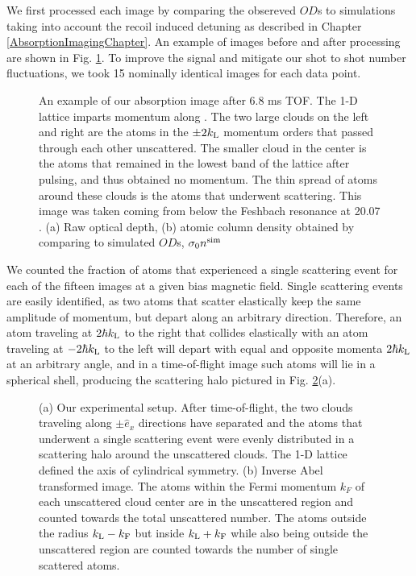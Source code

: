 We first processed each image by comparing the obsereved $OD$s to simulations taking into account the recoil induced detuning as described in Chapter \ref{AbsorptionImagingChapter}. An example of images before and after processing are shown in Fig. \ref{fig:SampleCorrection}.  To improve the signal and mitigate our shot to shot number fluctuations, we took 15 nominally identical images for each data point.
\begin{figure}
\caption{An example of our absorption image after 6.8 ms TOF. The 1-D lattice imparts momentum along \ex{}. The two large clouds on the left and right are the atoms in the $\pm 2 k_{\rm{L}}$ momentum orders that passed through each other unscattered. The smaller cloud in the center is the atoms that remained in the lowest band of the lattice after pulsing, and thus obtained no momentum. The thin spread of atoms around these clouds is the atoms that underwent scattering.   This image was taken coming from below the Feshbach resonance at 20.07  \mT{}. (a) Raw optical depth, (b) atomic column density obtained by comparing to simulated $OD$s, $\sigma_0 n^{\rm{sim}}$ }
\label{fig:SampleCorrection}
\end{figure}

We counted the fraction of atoms that experienced a single scattering event for each of the fifteen images at a given bias magnetic field. Single scattering events are easily identified, as two atoms that scatter elastically keep the same amplitude of momentum, but depart along an arbitrary direction. Therefore, an atom traveling at $2 \hbar k_{\rm{L}}$ to the right that collides elastically with an atom traveling at $-2 \hbar k_{\rm{L}}$ to the left will depart with equal and opposite momenta $2 \hbar k_{\rm{L}}$ at an arbitrary angle, and in a time-of-flight image such atoms will lie in a spherical shell, producing the scattering halo pictured in Fig. \ref{fig:halo}(a).
\begin{figure}
\caption{(a) Our experimental setup. After time-of-flight, the two clouds traveling along $\pm \hat{e}_x$ directions have separated and the atoms that underwent a single scattering event were evenly distributed in a scattering halo around the unscattered clouds. The 1-D lattice defined the axis of cylindrical symmetry. (b) Inverse Abel transformed image. The atoms within the Fermi momentum $k_F$ of each unscattered cloud center are in the unscattered region and counted towards the total unscattered number. The atoms outside the radius $ k_{\rm{L}}-k_{\rm{F}}$ but inside $k_{\rm{L}}+k_{\rm{F}}$ while also being outside the unscattered region are counted towards the number of single scattered atoms.   }
\label{fig:halo}
\end{figure}

